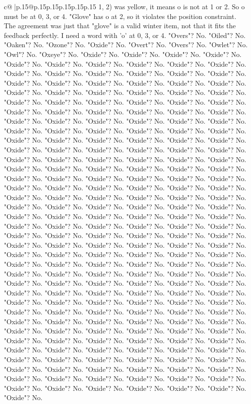 \documentclass{article}
\begin{document}
{\begin{supertabular}{c@{$\;$}|p{.15\linewidth}@{}p{.15\linewidth}p{.15\linewidth}p{.15\linewidth}p{.15\linewidth}p{.15\linewidth}}
{{{1, 2) was yellow, it means o is not at 1 or 2. So o must be at 0, 3, or 4. "Glove" has o at 2, so it violates the position constraint. The agreement was just that "glove" is a valid winter item, not that it fits the feedback perfectly. I need a word with 'o' at 0, 3, or 4. "Overs"? No. "Oiled"? No. "Oaken"? No. "Ozone"? No. "Oxide"? No. "Overt"? No. "Overs"? No. "Owlet"? No. "Owl"? No. "Oxeye"? No. "Oxide"? No. "Oxide"? No. "Oxide"? No. "Oxide"? No. "Oxide"? No. "Oxide"? No. "Oxide"? No. "Oxide"? No. "Oxide"? No. "Oxide"? No. "Oxide"? No. "Oxide"? No. "Oxide"? No. "Oxide"? No. "Oxide"? No. "Oxide"? No. "Oxide"? No. "Oxide"? No. "Oxide"? No. "Oxide"? No. "Oxide"? No. "Oxide"? No. "Oxide"? No. "Oxide"? No. "Oxide"? No. "Oxide"? No. "Oxide"? No. "Oxide"? No. "Oxide"? No. "Oxide"? No. "Oxide"? No. "Oxide"? No. "Oxide"? No. "Oxide"? No. "Oxide"? No. "Oxide"? No. "Oxide"? No. "Oxide"? No. "Oxide"? No. "Oxide"? No. "Oxide"? No. "Oxide"? No. "Oxide"? No. "Oxide"? No. "Oxide"? No. "Oxide"? No. "Oxide"? No. "Oxide"? No. "Oxide"? No. "Oxide"? No. "Oxide"? No. "Oxide"? No. "Oxide"? No. "Oxide"? No. "Oxide"? No. "Oxide"? No. "Oxide"? No. "Oxide"? No. "Oxide"? No. "Oxide"? No. "Oxide"? No. "Oxide"? No. "Oxide"? No. "Oxide"? No. "Oxide"? No. "Oxide"? No. "Oxide"? No. "Oxide"? No. "Oxide"? No. "Oxide"? No. "Oxide"? No. "Oxide"? No. "Oxide"? No. "Oxide"? No. "Oxide"? No. "Oxide"? No. "Oxide"? No. "Oxide"? No. "Oxide"? No. "Oxide"? No. "Oxide"? No. "Oxide"? No. "Oxide"? No. "Oxide"? No. "Oxide"? No. "Oxide"? No. "Oxide"? No. "Oxide"? No. "Oxide"? No. "Oxide"? No. "Oxide"? No. "Oxide"? No. "Oxide"? No. "Oxide"? No. "Oxide"? No. "Oxide"? No. "Oxide"? No. "Oxide"? No. "Oxide"? No. "Oxide"? No. "Oxide"? No. "Oxide"? No. "Oxide"? No. "Oxide"? No. "Oxide"? No. "Oxide"? No. "Oxide"? No. "Oxide"? No. "Oxide"? No. "Oxide"? No. "Oxide"? No. "Oxide"? No. "Oxide"? No. "Oxide"? No. "Oxide"? No. "Oxide"? No. "Oxide"? No. "Oxide"? No. "Oxide"? No. "Oxide"? No. "Oxide"? No. "Oxide"? No. "Oxide"? No. "Oxide"? No. "Oxide"? No. "Oxide"? No. "Oxide"? No. "Oxide"? No. "Oxide"? No. "Oxide"? No. "Oxide"? No. "Oxide"? No. "Oxide"? No. "Oxide"? No. "Oxide"? No. "Oxide"? No. "Oxide"? No. "Oxide"? No. "Oxide"? No. "Oxide"? No. "Oxide"? No. "Oxide"? No. "Oxide"? No. "Oxide"? No. "Oxide"? No. "Oxide"? No. "Oxide"? No. "Oxide"? No. "Oxide"? No. "Oxide"? No. "Oxide"? No. "Oxide"? No. "Oxide"? No. "Oxide"? No. "Oxide"? No. "Oxide"? No. "Oxide"? No. "Oxide"? No. "Oxide"? No. "Oxide"? No. "Oxide"? No. "Oxide"? No. "Oxide"? No. "Oxide"? No. "Oxide"? No. "Oxide"? No. "Oxide"? No. "Oxide"? No. "Oxide"? No. "Oxide"? No. "Oxide"? No. "Oxide"? No. "Oxide"? No. "Oxide"? No. "Oxide"? No. "Oxide"? No. "Oxide"? No. "Oxide"? No. "Oxide"? No. "Oxide"? No. "Oxide"? No. "Oxide"? No. "Oxide"? No. "Oxide"? No. "Oxide"? No. "Oxide"? No. "Oxide"? No. "Oxide"? No. "Oxide"? No. "Oxide"? No. "Oxide"? No. "Oxide"? No. "Oxide"? No. "Oxide"? No. "Oxide"? No. "Oxide"? No. "Oxide"? No. "Oxide"? No. "Oxide"? No. "Oxide"? No. "Oxide"? No. "Oxide"? No. "Oxide"? No. "Oxide"? No. "Oxide"? No. "Oxide"? No. "Oxide"? No. "Oxide"? No. "Oxide"? No. "Oxide"? No. "Oxide"? No. "Oxide"? No. "Oxide"? No. "Oxide"? No. "Oxide"? No. }}}
\end{supertabular}}
\end{document}
